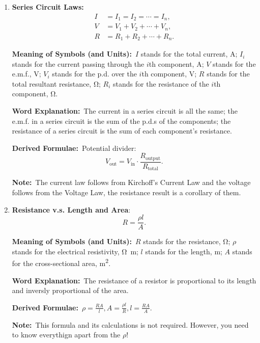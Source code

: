 \documentclass[8pt]{article}
\newcommand{\MeanSymb}{\textbf{Meaning of Symbols (and Units):}\ }
\newcommand{\WordExpl}{\textbf{Word Explanation:}\ }
\newcommand{\DeriForm}{\textbf{Derived Formulae:}\ }
\newcommand{\Note}{\textbf{Note:}\ }
\begin{document}
\begin{enumerate}
                \DeriForm Too many.

                \Note The p.d. and the e.m.f. are the same, as you are effectively measuring the same thing. The result of the current follows from the Kirchoff's Current Law and the resistance formula follows.

                \item \textbf{Series Circuit Laws:}
                \begin{align*}
                    I &= I_1 = I_2 = \cdots = I_n,\\
                    V &= V_1 + V_2 + \cdots + V_n,\\
                    R &= R_1 + R_2 + \cdots + R_n.
                \end{align*}

                \MeanSymb \(I\) stands for the total current, \unit{\ampere}; \(I_i\) stands for the current passing through the \(i\)th component, \unit{\ampere}; \(V\) stands for the e.m.f., \unit{\volt}; \(V_i\) stands for the p.d. over the \(i\)th component, \unit{\volt}; \(R\) stands for the total resultant resistance, \unit{\ohm}; \(R_i\) stands for the resistance of the \(i\)th component, \unit{\ohm}.

                \WordExpl The current in a series circuit is all the same; the e.m.f. in a series circuit is the sum of the p.d.s of the components; the resistance of a series circuit is the sum of each component's resistance.

                \DeriForm Potential divider:
                \[
                    V_{\text{out}} = V_{\text{in}} \cdot \frac{R_{\text{output}}}{R_{\text{total}}}.
                \]

                \Note The current law follows from Kirchoff's Current Law and the voltage follows from the Voltage Law, the resistance result is a corollary of them.

                \item \textbf{Resistance v.s. Length and Area}:
                \[
                    R = \frac{\rho l}{A}.
                \]

                \MeanSymb \(R\) stands for the resistance, \unit{\ohm}; \(\rho\) stands for the electrical resistivity, \unit{\ohm \metre}; \(l\) stands for the length, \unit{\metre}; \(A\) stands for the cross-sectional area, \unit{\metre\squared}.

                \WordExpl The resistance of a resistor is proportional to its length and inversly proportional of the area.

                \DeriForm \(\rho = \frac{RA}{l}, A = \frac{\rho l}{R}, l = \frac{RA}{A}\).

                \Note This formula and its calculations is not required. However, you need to know everythign apart from the \(\rho\)!
            \end{enumerate}
\end{document}
